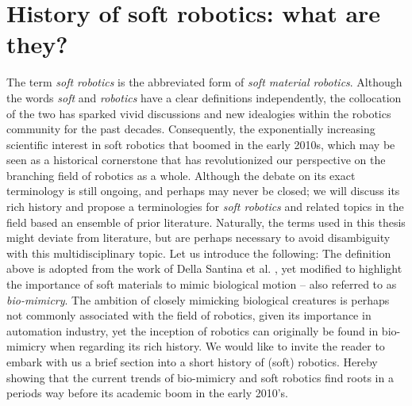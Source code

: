 \section{History of soft robotics: what are they?} 
\label{sec:intro:history}
The term \emph{soft robotics} is the abbreviated form of \emph{soft material robotics}. Although the words \emph{soft} and \emph{robotics} have a clear definitions independently, the collocation of the two has sparked vivid discussions and new idealogies within the robotics community for the past decades. %
Consequently, the exponentially increasing scientific interest in soft robotics that boomed in the early 2010s, which may be seen as a historical cornerstone that has revolutionized our perspective on the branching field of robotics as a whole. %
Although the debate on its exact terminology is still ongoing, and perhaps may never be closed; we will discuss its rich history and propose a terminologies for \emph{soft robotics} and related topics in the field based an ensemble of prior literature. Naturally, the terms used in this thesis might deviate from literature, but are perhaps necessary to avoid disambiguity with this multidisciplinary topic. Let us introduce the following:
%
%
The definition above is adopted from the work of Della Santina et al. \cite{}, yet modified to highlight the importance of soft materials to mimic biological motion -- also referred to as \emph{bio-mimicry}. The ambition of closely mimicking biological creatures is perhaps not commonly associated with the field of robotics, given its importance in automation industry, yet the inception of robotics can originally be found in bio-mimicry when regarding its rich history. We would like to invite the reader to embark with us a brief section into a short history of (soft) robotics. Hereby showing that the current trends of bio-mimicry and soft robotics find roots in a periods way before its academic boom in the early 2010's.
\vspace{0.085em}
%
